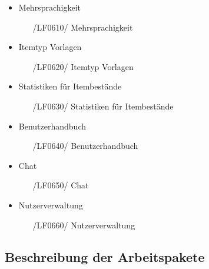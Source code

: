 \documentclass[11pt,a4paper]{report}
\begin{document}
\begin{itemize}
  \begin{itemize}
  	\item
  		Mehrsprachigkeit
  		\begin{itemize}
  		\leftskip=3em
  		\item[/LF0610/] Mehrsprachigkeit
  		\end{itemize}
	\item
  		Itemtyp Vorlagen
  		\begin{itemize}
  		\leftskip=3em
  		\item[/LF0620/] Itemtyp Vorlagen
  		\end{itemize}
	\item
  		Statistiken für Itembestände
  		\begin{itemize}
  		\leftskip=3em
  		\item[/LF0630/] Statistiken für Itembestände
  		\end{itemize}
	\item
  		Benutzerhandbuch
  		\begin{itemize}
  		\leftskip=3em
  		\item[/LF0640/] Benutzerhandbuch
  		\end{itemize}
	\item
  		Chat
  		\begin{itemize}
  		\leftskip=3em
  		\item[/LF0650/] Chat
  		\end{itemize}
  	\item
  		Nutzerverwaltung
  		\begin{itemize}
  		\leftskip=3em
  		\item[/LF0660/] Nutzerverwaltung
  		\end{itemize}
  \end{itemize}

\end{itemize}
\newpage

\subsection{Beschreibung der Arbeitspakete}
\end{document}

